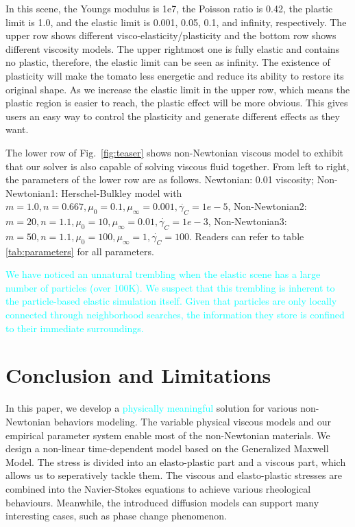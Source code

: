 \documentclass[10pt,journal,compsoc]{IEEEtran}
\newcommand{\revised}[1]{{\textcolor{cyan}{#1}}}
\begin{document}
In this scene, the Youngs modulus is 1e7, the Poisson ratio is 0.42, the plastic limit is 1.0, and the elastic limit is 0.001, 0.05, 0.1, and infinity, respectively. The upper row shows different visco-elasticity/plasticity and the bottom row shows different viscosity models.
The upper rightmost one is fully elastic and contains no plastic, therefore, the elastic limit can be seen as infinity. The existence of plasticity will make the tomato less energetic and reduce its ability to restore its original shape. As we increase the elastic limit in the upper row, which means the plastic region is easier to reach, the plastic effect will be more obvious. This gives users an easy way to control the plasticity and generate different effects as they want.

The lower row of Fig.~\ref{fig:teaser} shows non-Newtonian viscous model to exhibit that our solver is also capable of solving viscous fluid together. From left to right, the parameters  of the lower row are as follows.   Newtonian: 0.01 viscosity; Non-Newtonian1: Herschel-Bulkley model with $m=1.0, n=0.667, \mu_0=0.1, \mu_{\infty}=0.001, \dot{\gamma_C}=1e-5$, Non-Newtonian2: $m=20, n=1.1, \mu_0=10, \mu_{\infty}=0.01, \dot{\gamma_C}=1e-3$,  Non-Newtonian3: $m=50, n=1.1, \mu_0=100,\mu_{\infty}=1, \dot{\gamma_C}=100$. Readers can refer to table \ref{tab:parameters} for all parameters.

\revised{We have noticed an unnatural trembling when the elastic scene has a large number of particles (over 100K).%
We suspect that this trembling is inherent to the particle-based elastic simulation itself. Given that particles are only locally connected through neighborhood searches, the information they store is confined to their immediate surroundings.} %

\section{Conclusion and Limitations}
In this paper, we develop a \revised{physically meaningful} solution for various non-Newtonian behaviors modeling. The variable physical viscous models and our empirical parameter system enable most of the non-Newtonian materials. We design a non-linear time-dependent model based on the Generalized Maxwell Model. The stress is divided into an elasto-plastic part and a viscous part, which allows us to seperatively tackle them.  The viscous and elasto-plastic stresses are combined into the Navier-Stokes equations to achieve various rheological behaviours. Meanwhile, the introduced diffusion models can support many interesting cases, such as phase change phenomenon.
\end{document}
